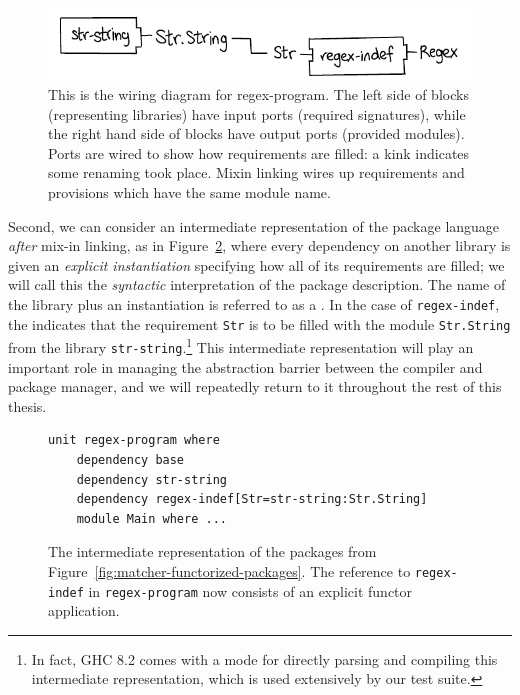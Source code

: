 \begin{figure}
\center%
\includegraphics{figures/regex-indef-instantiated.pdf}
\caption{This is the wiring diagram for regex-program. The left side of blocks
(representing libraries) have input ports (required signatures), while the right hand side
of blocks have output ports (provided modules). Ports are wired to show how requirements are
filled: a kink indicates some renaming took place. Mixin linking wires up requirements
and provisions which have the same module name.}
\label{fig:regex-indef-instantiated}
\end{figure}

Second, we can consider an intermediate representation of the package language
\emph{after} mix-in linking,
as in Figure~\ref{fig:matcher-bkp}, where every dependency on another library
is given an \emph{explicit instantiation} specifying how all of its requirements
are filled; we will call this the \emph{syntactic} interpretation of
the package description. The name of the library plus an instantiation is referred
to as a \emph{\uid{}}.  In the case of \verb|regex-indef|, the
\uid{} indicates that the requirement \verb|Str| is to be filled
with the module \verb|Str.String| from the library \verb|str-string|.\footnote{In
fact, GHC 8.2 comes with a mode for directly parsing and compiling this intermediate
representation, which is used extensively by our test suite.}  This intermediate
representation will play an important role in managing the abstraction barrier
between the compiler and package manager, and we will repeatedly return to
it throughout the rest of this thesis.

\begin{figure}
\begin{lstlisting}
unit regex-program where
    dependency base
    dependency str-string
    dependency regex-indef[Str=str-string:Str.String]
    module Main where ...
\end{lstlisting}
\caption{The intermediate representation of the packages from Figure~\ref{fig:matcher-functorized-packages}.
The reference to \texttt{regex-indef} in \texttt{regex-program} now consists of an explicit functor application.}
\label{fig:matcher-bkp}
\end{figure}

